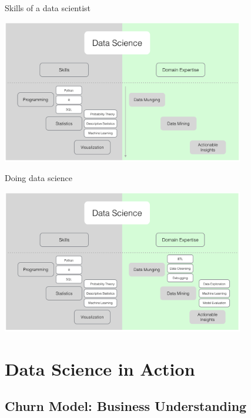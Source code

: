 \documentclass[10pt]{beamer}
\begin{document}
    \begin{frame}{Skills of a data scientist}
      \begin{center}
        \includegraphics[width=300pt]{../graphs/data_science_skills}
      \end{center}
    \end{frame}

    \begin{frame}{Doing data science}
      \begin{center}
        \includegraphics[width=300pt]{../graphs/data_science_skills_domain}
      \end{center}
    \end{frame}

\section{Data Science in Action}

  \subsection{Churn Model: Business Understanding}
\end{document}
